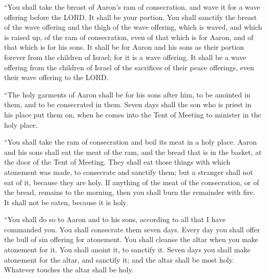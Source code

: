 \myverse{}“You shall take the breast of Aaron’s ram of consecration, and
wave it for a wave offering before the LORD. It shall be your portion.
\myverse{}You shall sanctify the breast of the wave offering and the thigh of the wave
offering, which is waved, and which is raised up, of the ram of consecration, even of that which is for
Aaron, and of that which is for his sons.
\myverse{}It shall be for Aaron and his sons as their portion forever from the children
of Israel; for it is a wave offering. It shall be a wave offering from the children of Israel of the sacrifices
of their peace offerings, even their wave offering to the LORD.


\myverse{}“The holy garments of Aaron shall be for his sons after him,
to be anointed in them, and to be consecrated in them.
\myverse{}Seven days shall the son who is priest in his place put them on, when he
comes into the Tent of Meeting to minister in the holy place.


\myverse{}“You shall take the ram of consecration and boil its meat in
a holy place.
\myverse{}Aaron and his sons shall eat the meat of the ram, and the bread that is in
the basket, at the door of the Tent of Meeting.
\myverse{}They shall eat those things with which atonement was made, to consecrate
and sanctify them; but a stranger shall not eat of it, because they are holy.
\myverse{}If anything of the meat of the consecration, or of the bread, remains to
the morning, then you shall burn the remainder with fire. It shall not be eaten, because it is holy.


\myverse{}“You shall do so to Aaron and to his sons, according to all
that I have commanded you. You shall consecrate them seven days.
\myverse{}Every day you shall offer the bull of sin offering for atonement. You shall
cleanse the altar when you make atonement for it. You shall anoint it, to sanctify it.
\myverse{}Seven days you shall make atonement for the altar, and sanctify it; and the
altar shall be most holy. Whatever touches the altar shall be holy.


